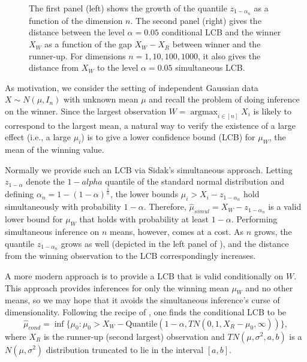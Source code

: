 \documentclass{article}
\DeclareMathOperator*{\argmax}{argmax}
\begin{document}
\begin{figure}
{\begin{minipage}{0.48\textwidth}
    \end{minipage}
    }
    \caption{ The first panel (left) shows the growth of the quantile $z_{1 - \alpha_n}$ as a function of the dimension $n$. The second panel (right) gives the distance between the level $\alpha=0.05$ conditional LCB and the winner $X_W$ as a function of the gap $X_W - X_R$ between winner and the runner-up. For dimensions $n=1,10,100,1000$, it also gives the distance from $X_W$ to the level $\alpha=0.05$ simultaneous LCB.}
    \label{fig:winner}
\end{figure}

As motivation, we consider the setting of independent Gaussian data $X \sim N(\mu, I_n)$ with unknown mean $\mu$ and recall the problem of doing inference on the winner. Since the largest observation $W = \argmax_{i \in [n]} X_i$ is likely to correspond to the largest mean, a natural way to verify the existence of a large effect (i.e., a large $\mu_i$) is to give a lower confidence bound (LCB) for $\mu_W$, the mean of the winning value. 

Normally we provide such an LCB via Sidak's simultaneous approach. Letting $z_{1-\alpha}$ denote the $1-alpha$ quantile of the standard normal distribution and defining $\alpha_n = 1 - (1-\alpha)^\frac{1}{n}$, the lower bounds $ \mu_i > X_i - z_{1 - \alpha_n}$ hold simultaneously with probability $1-\alpha$. Therefore, $\hat{\mu}_{simul} = X_W - z_{1 - \alpha_n}$ is a valid lower bound for $\mu_W$ that holds with probability at least $1-\alpha$. Performing simultaneous inference on $n$ means, however, comes at a cost. As $n$ grows, the quantile $z_{1 - \alpha_n}$ grows as well (depicted in the left panel of ), and the distance from the winning observation to the LCB correspondingly increases. 

A more modern approach is to provide a LCB that is valid conditionally on $W$. This approach provides inferences for only the winning mean $\mu_W$ and no other means, so we may hope that it avoids the simultaneous inference's curse of dimensionality. Following the recipe of \cite{Fithian2017}, one finds the conditional LCB to be 
\begin{equation}
    \label{eq:motivating_conditional_lcb}
    \hat{\mu}_{cond} = \inf \{\mu_0 : \mu_0 > X_W - \text{Quantile}(1-\alpha, TN(0, 1, X_R - \mu_0, \infty))  \},
\end{equation}
where $X_R$ is the runner-up (second largest) observation and $TN(\mu, \sigma^2, a, b)$ is a $N(\mu, \sigma^2)$ distribution truncated to lie in the interval $[a, b]$. 
\end{document}
